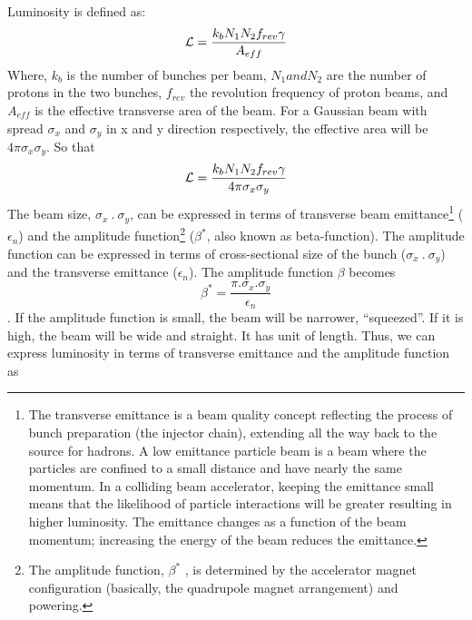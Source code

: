 {{{Luminosity is defined as:
\begin{equation}
    \mathcal{L} = \frac{k_bN_1N_2f_{rev}\gamma}{A_{eff}}
\end{equation}
Where, $k_b$ is the number of bunches per beam, $N_1 and N_2$ are the number of protons in the two bunches, $f_{rev}$ the revolution frequency of proton beams, and $A_{eff}$ is the effective transverse area of the beam.
For a Gaussian beam with spread $\sigma_x$ and $\sigma_y$ in x and y direction respectively, the effective area will be $4\pi \sigma_x \sigma_y$. So that
\begin{equation}\label{eq:luminosity}
    \mathcal{L} = \frac{k_bN_1N_2f_{rev}\gamma}{4 \pi \sigma_x \sigma_y}
\end{equation}
The beam size, $\sigma_x~.~\sigma_y$, can be expressed in terms of transverse beam emittance\footnote{The transverse emittance is a beam quality concept reflecting the process of bunch preparation (the injector chain), extending all the way back to the source for hadrons. A low emittance particle beam is a beam where the particles are confined to a small distance and have nearly the same momentum. In a colliding beam accelerator, keeping the emittance small means that the likelihood of particle interactions will be greater resulting in higher luminosity. The emittance changes as a function of the beam momentum; increasing the energy of the beam reduces the emittance.} ($\epsilon_n$) and the amplitude function\footnote{The amplitude function, $\beta^*$ , is determined by the accelerator magnet configuration (basically, the quadrupole magnet arrangement) and powering. } ($\beta^*$, also known as beta-function). The amplitude function can be expressed in terms of cross-sectional size of the bunch ($\sigma_x~.~\sigma_y$) and  the transverse emittance ($\epsilon_n$). The amplitude function $\beta$  becomes 
\begin{equation}\label{eq:beta_function}
	\beta^* = \frac{\pi.\sigma_x.\sigma_y}{\epsilon_n}
\end{equation}. If the amplitude function is small, the beam will be narrower, ``squeezed''. If it is high, the beam will be wide and straight. It has unit of length. Thus, we can express luminosity in terms of transverse emittance and the amplitude function as
}}}
